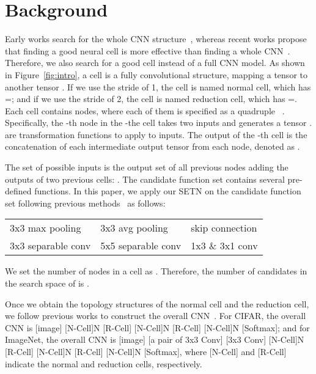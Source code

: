 \documentclass[10pt,twocolumn,letterpaper]{article}
\def\Figref#1{Figure~\ref{#1}}
\def\NAME{{SETN}}
\begin{document}
\section{Background}\label{sec:background}


Early works search for the whole CNN structure~\cite{zoph2017NAS,bello2017neural}, whereas recent works propose that finding a good neural cell is more effective than finding a whole CNN~\cite{Liu_2018_ECCV,liu2019darts,zhang2019graph,dong2019search}.
Therefore, we also search for a good cell instead of a full CNN model.
As shown in \Figref{fig:intro}, a cell is a fully convolutional structure, mapping a tensor  to another tensor .
If we use the stride of 1, the cell is named normal cell, which has =; and if we use the stride of 2, the cell is named reduction cell, which has =.
Each cell contains  nodes, where each of them is specified as a quadruple ~\cite{Liu_2018_ECCV}.
Specifically, the -th node in the -the cell takes two inputs  and generates a tensor .
 are transformation functions to apply to inputs.
The output of the -th cell is the concatenation of each intermediate output tensor from each node, denoted as .


The set of possible inputs  is the output set of all previous nodes adding the outputs of two previous cells: {}. The candidate function set  contains several pre-defined functions.
In this paper, we apply our {\NAME} on the candidate function set  following previous methods~\cite{liu2019darts,dong2019search} as follows:
\begin{table}[H]
\small
\vspace{-3mm}
\setlength{\tabcolsep}{0.3em} \centering
\def\arraystretch{1.0}
\begin{tabular}{lll}
 3x3 max pooling     &  3x3 avg pooling  &  skip connection     \\
 3x3 separable conv  &  5x5 separable conv &  1x3 \& 3x1 conv \\
\end{tabular}
\vspace{-3mm}
\end{table}
\noindent We set the number of nodes in a cell as .
Therefore, the number of candidates in the search space of  is .



Once we obtain the topology structures of the normal cell and the reduction cell, we follow previous works to construct the overall CNN~\cite{Liu_2018_ECCV,liu2019darts,dong2019search}.
For CIFAR, the overall CNN is [image]  [N-Cell]N  [R-Cell]  [N-Cell]N  [R-Cell]  [N-Cell]N  [Softmax];
and for ImageNet, the overall CNN is [image]  [a pair of 3x3 Conv]  [3x3 Conv]  [N-Cell]N  [R-Cell]  [N-Cell]N  [R-Cell]  [N-Cell]N  [Softmax], where [N-Cell] and [R-Cell] indicate the normal and reduction cells, respectively.
\end{document}
